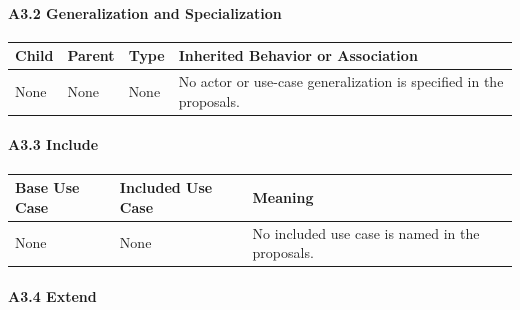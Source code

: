 \documentclass[12pt]{article}
\renewcommand{\baselinestretch}{1.5}
\begin{document}
\hypertarget{sec:a3-2-generalization-and-specialization}{}
\paragraph*{A3.2 Generalization and Specialization}
\par\medskip

\begingroup
\small
\renewcommand{\baselinestretch}{1.0}\selectfont
\renewcommand{\arraystretch}{1.15}
\setlength{\tabcolsep}{6pt}
\begin{longtable}{|>{\raggedright\arraybackslash}p{}|>{\raggedright\arraybackslash}p{}|>{\raggedright\arraybackslash}p{}|>{\raggedright\arraybackslash}p{}|}
\hline
\textbf{Child} & \textbf{Parent} & \textbf{Type} & \textbf{Inherited Behavior or Association} \\ \hline
\endhead
None & None & None & No actor or use-case generalization is specified in the proposals. \\ \hline
\end{longtable}
\endgroup
\par\medskip

\hypertarget{sec:a3-3-include}{}
\paragraph*{A3.3 Include}
\par\medskip

\begingroup
\small
\renewcommand{\baselinestretch}{1.0}\selectfont
\renewcommand{\arraystretch}{1.15}
\setlength{\tabcolsep}{6pt}
\begin{longtable}{|>{\raggedright\arraybackslash}p{}|>{\raggedright\arraybackslash}p{}|>{\raggedright\arraybackslash}p{}|}
\hline
\textbf{Base Use Case} & \textbf{Included Use Case} & \textbf{Meaning} \\ \hline
\endhead
None & None & No included use case is named in the proposals. \\ \hline
\end{longtable}
\endgroup
\par\medskip

\hypertarget{sec:a3-4-extend}{}
\paragraph*{A3.4 Extend}
\par\medskip
\end{document}
